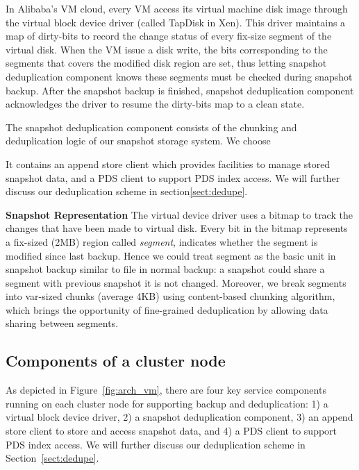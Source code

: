 {%
In Alibaba's VM cloud, every VM access its virtual machine disk image through the
virtual block device driver (called TapDisk\cite{Warfield2005} in Xen).
This driver maintains a map of dirty-bits to record
the change status of every fix-size segment of the virtual disk. 
When the VM issue a disk write, the bits corresponding to the segments that covers 
the modified disk region are set, thus letting snapshot deduplication component knows these
segments must be checked during snapshot backup. After the snapshot backup is finished, 
snapshot deduplication component acknowledges the driver to resume the dirty-bits map to
a clean state.

The snapshot deduplication component consists of the chunking and deduplication 
logic of our snapshot storage system. We choose 

It contains an append store client which provides facilities to manage stored snapshot data, and a PDS client to support PDS index access. We will further discuss our deduplication scheme in section\ref{sect:dedupe}.


{\bf Snapshot Representation}
The virtual device driver uses a bitmap to track the changes 
that have been made to virtual disk.
Every bit in the bitmap represents a fix-sized (2MB) region called \textit{segment}, indicates whether the segment
is modified since last backup. Hence we could treat segment as the basic unit 
in snapshot backup similar to
file in normal backup: a snapshot could share a segment with previous snapshot it is not changed. 
Moreover, we break segments into var-sized chunks (average 4KB) using content-based chunking algorithm,
which brings the opportunity of fine-grained deduplication by
allowing data sharing between segments.
}

\subsection{ Components of a cluster node } 

As  depicted in Figure~\ref{fig:arch_vm}, 
there are four key service components running on each cluster
node  for supporting backup and deduplication: 
1) a virtual block device driver, 2) a snapshot deduplication component,
3) an append store client to store  and access snapshot data,
and 4)  a PDS client to support PDS index access. We will further discuss our deduplication scheme 
in Section~\ref{sect:dedupe}.


